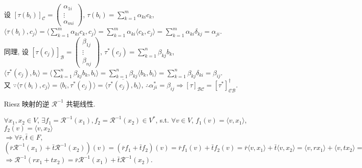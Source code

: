 \documentclass{note}
\begin{document}
\begin{pf}
\begin{itemize}
        设 $[\tau(b_i)]_{\mathcal{C}}=\begin{pmatrix}
            \alpha_{1i}\\
            \vdots\\
            \alpha_{mi}
        \end{pmatrix}$, $\tau(b_i)=\sum_{k=1}^m\alpha_{ki}c_k$, $\langle\tau(b_i),c_j\rangle=\langle\sum_{k=1}^m\alpha_{ki}c_k,c_j\rangle=\sum_{k=1}^m\alpha_{ki}\langle c_k,c_j\rangle=\sum_{k=1}^m\alpha_{ki}\delta_{kj}=\alpha_{ji}$.\\
        同理, 设 $[\tau(c_j)]_{\mathcal{B}}=\begin{pmatrix}
            \beta_{1j}\\
            \vdots\\
            \beta_{nj}
        \end{pmatrix}$, $\tau^*(c_j)=\sum_{k=1}^n\beta_{kj}b_k$, $\langle \tau^*(c_j),b_i\rangle=\langle\sum_{k=1}^n\beta_{kj}b_k,b_i\rangle=\sum_{k=1}^n\beta_{kj}\langle b_k,b_i\rangle=\sum_{k=1}^n\beta_{kj}\delta_{ki}=\beta_{ij}$.\\
        又 $\because\langle\tau(b_i),c_j\rangle=\langle b_i,\tau^*(c_j)\rangle=\overline{\langle\tau^*(c_j),b_i\rangle}$, $\therefore\alpha_{ji}^*=\beta_{ij}\Longrightarrow[\tau]_{\mathcal{BC}}=[\tau^*]_{\mathcal{CB}}^{\dagger}$.
    \end{itemize}
\end{pf}

\begin{cor}\label{inverse Riesz conjugate linear}
    Riesz 映射的逆 $\mathcal{R}^{-1}$ 共轭线性.
\end{cor}
\begin{pf}
    $\forall x_1,x_2\in V$, $\exists f_1=\mathcal{R}^{-1}(x_1),f_2=\mathcal{R}^{-1}(x_2)\in V^*$, s.t. $\forall v\in V$, $f_1(v)=\langle v,x_1\rangle$, $f_2(v)=\langle v,x_2\rangle$\\
    $\Longrightarrow\forall\bar{r},\bar{t}\in F$, $(\bar{r}\mathcal{R}^{-1}(x_1)+\bar{t}\mathcal{R}^{-1}(x_2))(v)=(\bar{r}f_1+\bar{t}f_2)(v)=\bar{r}f_1(v)+\bar{t}f_2(v)=\bar{r}\langle v,x_1\rangle+\bar{t}\langle v,x_2\rangle=\langle v,rx_1\rangle+\langle v,tx_2\rangle=\langle v,rx_1+tx_2\rangle=\mathcal{R}^{-1}(rx_1+rx_2)(v)$\\
    $\Longrightarrow\mathcal{R}^{-1}(rx_1+tx_2)=\bar{r}\mathcal{R}^{-1}(x_1)+\bar{t}\mathcal{R}^{-1}(x_2)$.
\end{pf}
\end{document}
